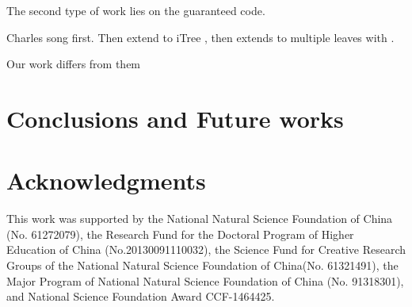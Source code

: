 \documentclass{sig-alternate-05-2015}
\begin{document}
%
%



The second type of work lies on the guaranteed code.

Charles song \cite{reisner2010using} first. Then extend to iTree \cite{song2012itree}, then extends to multiple leaves with \cite{song2014itree}.

Our work differs from them

\section{Conclusions and Future works}\label{sec:conclusion}


\section{Acknowledgments}
This work was supported by the National Natural Science Foundation of China (No. 61272079), the Research Fund for the Doctoral Program of Higher Education of China (No.20130091110032), the Science Fund for Creative Research Groups of the National Natural Science Foundation of China(No. 61321491), the Major Program of National Natural Science Foundation of China (No. 91318301), and National Science Foundation Award CCF-1464425.
\end{document}
